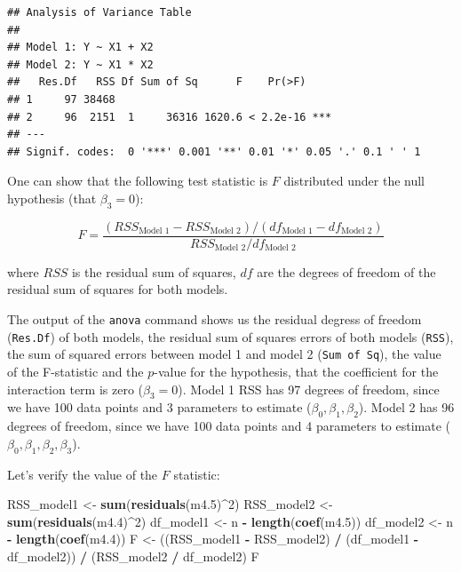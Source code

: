 \documentclass[
]{book}
\newenvironment{Shaded}{\begin{snugshade}}{\end{snugshade}}
\newcommand{\DecValTok}[1]{\textcolor[rgb]{0.00,0.00,0.81}{#1}}
\newcommand{\FloatTok}[1]{\textcolor[rgb]{0.00,0.00,0.81}{#1}}
\newcommand{\FunctionTok}[1]{\textcolor[rgb]{0.13,0.29,0.53}{\textbf{#1}}}
\newcommand{\NormalTok}[1]{#1}
\newcommand{\OtherTok}[1]{\textcolor[rgb]{0.56,0.35,0.01}{#1}}
\newcommand{\SpecialCharTok}[1]{\textcolor[rgb]{0.81,0.36,0.00}{\textbf{#1}}}
\begin{document}
\begin{verbatim}
## Analysis of Variance Table
## 
## Model 1: Y ~ X1 + X2
## Model 2: Y ~ X1 * X2
##   Res.Df   RSS Df Sum of Sq      F    Pr(>F)    
## 1     97 38468                                  
## 2     96  2151  1     36316 1620.6 < 2.2e-16 ***
## ---
## Signif. codes:  0 '***' 0.001 '**' 0.01 '*' 0.05 '.' 0.1 ' ' 1
\end{verbatim}

One can show that the following test statistic is \(F\) distributed under the null hypothesis (that \(\beta_3=0\)):

\[ F = \frac{\left(RSS_{\text{Model 1}} - RSS_{\text{Model 2}}\right) / \left(df_{\text{Model 1}} - df_{\text{Model 2}}\right)}{RSS_{\text{Model 2}} / df_{\text{Model 2}}}\]

where \(RSS\) is the residual sum of squares,
\(df\) are the degrees of freedom of the residual sum of squares for both models.

The output of the \texttt{anova} command shows us the residual degress of freedom (\texttt{Res.Df})
of both models, the residual sum of squares errors of both models (\texttt{RSS}),
the sum of squared errors between model 1 and model 2 (\texttt{Sum\ of\ Sq}), the value of the
F-statistic and the \(p\)-value for the hypothesis, that the coefficient for
the interaction term is zero (\(\beta_3=0\)). Model 1 RSS has 97 degrees of freedom, since we have 100 data points
and 3 parameters to estimate (\(\beta_0, \beta_1, \beta_2\)). Model 2 has 96 degrees of freedom, since
we have 100 data points and 4 parameters to estimate (\(\beta_0, \beta_1, \beta_2, \beta_3\)).

Let's verify the value of the \(F\) statistic:

\begin{Shaded}
\begin{Highlighting}[]
\NormalTok{RSS\_model1 }\OtherTok{\textless{}{-}} \FunctionTok{sum}\NormalTok{(}\FunctionTok{residuals}\NormalTok{(m4}\FloatTok{.5}\NormalTok{)}\SpecialCharTok{\^{}}\DecValTok{2}\NormalTok{)}
\NormalTok{RSS\_model2 }\OtherTok{\textless{}{-}} \FunctionTok{sum}\NormalTok{(}\FunctionTok{residuals}\NormalTok{(m4}\FloatTok{.4}\NormalTok{)}\SpecialCharTok{\^{}}\DecValTok{2}\NormalTok{)}
\NormalTok{df\_model1 }\OtherTok{\textless{}{-}}\NormalTok{ n }\SpecialCharTok{{-}} \FunctionTok{length}\NormalTok{(}\FunctionTok{coef}\NormalTok{(m4}\FloatTok{.5}\NormalTok{))}
\NormalTok{df\_model2 }\OtherTok{\textless{}{-}}\NormalTok{ n }\SpecialCharTok{{-}} \FunctionTok{length}\NormalTok{(}\FunctionTok{coef}\NormalTok{(m4}\FloatTok{.4}\NormalTok{))}
\NormalTok{F }\OtherTok{\textless{}{-}}\NormalTok{ ((RSS\_model1 }\SpecialCharTok{{-}}\NormalTok{ RSS\_model2) }\SpecialCharTok{/}\NormalTok{ (df\_model1 }\SpecialCharTok{{-}}\NormalTok{ df\_model2)) }\SpecialCharTok{/}\NormalTok{ (RSS\_model2 }\SpecialCharTok{/}\NormalTok{ df\_model2)}
\NormalTok{F}
\end{Highlighting}
\end{Shaded}
\end{document}
